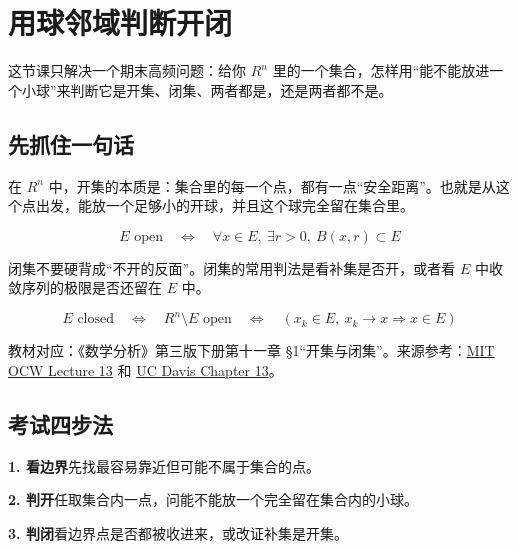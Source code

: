 \section{用球邻域判断开闭}

这节课只解决一个期末高频问题：给你 \(R^n\) 里的一个集合，怎样用“能不能放进一个小球”来判断它是开集、闭集、两者都是，还是两者都不是。

\subsection*{先抓住一句话}

在 \(R^n\) 中，开集的本质是：集合里的每一个点，都有一点“安全距离”。也就是从这个点出发，能放一个足够小的开球，并且这个球完全留在集合里。

\[
      E\text{ open}\quad\Longleftrightarrow\quad
      \forall x\in E,\ \exists r>0,\ B(x,r)\subset E
    \]

闭集不要硬背成“不开的反面”。闭集的常用判法是看补集是否开，或者看 \(E\) 中收敛序列的极限是否还留在 \(E\) 中。

\[
      E\text{ closed}
      \quad\Longleftrightarrow\quad
      R^n\setminus E\text{ open}
      \quad\Longleftrightarrow\quad
      (x_k\in E,\ x_k\to x \Rightarrow x\in E)
    \]

教材对应：《数学分析》第三版下册第十一章 §1“开集与闭集”。来源参考：\href{https://ocw.mit.edu/courses/18-100b-real-analysis-spring-2025/resources/ocw_18100b-lec13-2025apr03_mp4/}{MIT OCW Lecture 13} 和 \href{https://www.math.ucdavis.edu/~hunter/intro_analysis_pdf/ch13.pdf}{UC Davis Chapter 13}。

\subsection*{考试四步法}

\begin{conceptbox}
\textbf{1. 看边界}先找最容易靠近但可能不属于集合的点。
\end{conceptbox}

\begin{conceptbox}
\textbf{2. 判开}任取集合内一点，问能不能放一个完全留在集合内的小球。
\end{conceptbox}

\begin{conceptbox}
\textbf{3. 判闭}看边界点是否都被收进来，或改证补集是开集。
\end{conceptbox}

